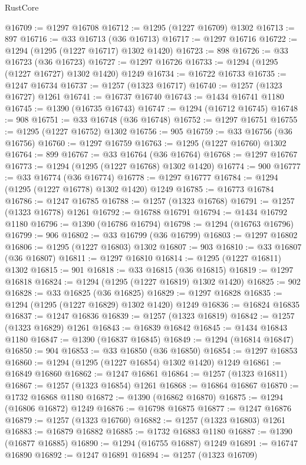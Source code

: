 \begin{lexlean}{RustCore}
\begin{coremodule}
@16709 := @1297 @16708
@16712 := @1295 (@1227 @16709) @1302
@16713 := 897
@16716 := @33 @16713 (@36 @16713)
@16717 := @1297 @16716
@16722 := @1294 (@1295 (@1227 @16717) @1302 @1420)
@16723 := 898
@16726 := @33 @16723 (@36 @16723)
@16727 := @1297 @16726
@16733 := @1294 (@1295 (@1227 @16727) @1302 @1420) @1249
@16734 := @16722 @16733
@16735 := @1247 @16734
@16737 := @1257 (@1323 @16717)
@16740 := @1257 (@1323 @16727) @1261
@16741 := @16737 @16740
@16743 := @1434 @16741 @1180
@16745 := @1390 (@16735 @16743)
@16747 := @1294 (@16712 @16745)
@16748 := 908
@16751 := @33 @16748 (@36 @16748)
@16752 := @1297 @16751
@16755 := @1295 (@1227 @16752) @1302
@16756 := 905
@16759 := @33 @16756 (@36 @16756)
@16760 := @1297 @16759
@16763 := @1295 (@1227 @16760) @1302
@16764 := 899
@16767 := @33 @16764 (@36 @16764)
@16768 := @1297 @16767
@16773 := @1294 (@1295 (@1227 @16768) @1302 @1420)
@16774 := 900
@16777 := @33 @16774 (@36 @16774)
@16778 := @1297 @16777
@16784 := @1294 (@1295 (@1227 @16778) @1302 @1420) @1249
@16785 := @16773 @16784
@16786 := @1247 @16785
@16788 := @1257 (@1323 @16768)
@16791 := @1257 (@1323 @16778) @1261
@16792 := @16788 @16791
@16794 := @1434 @16792 @1180
@16796 := @1390 (@16786 @16794)
@16798 := @1294 (@16763 @16796)
@16799 := 906
@16802 := @33 @16799 (@36 @16799)
@16803 := @1297 @16802
@16806 := @1295 (@1227 @16803) @1302
@16807 := 903
@16810 := @33 @16807 (@36 @16807)
@16811 := @1297 @16810
@16814 := @1295 (@1227 @16811) @1302
@16815 := 901
@16818 := @33 @16815 (@36 @16815)
@16819 := @1297 @16818
@16824 := @1294 (@1295 (@1227 @16819) @1302 @1420)
@16825 := 902
@16828 := @33 @16825 (@36 @16825)
@16829 := @1297 @16828
@16835 := @1294 (@1295 (@1227 @16829) @1302 @1420) @1249
@16836 := @16824 @16835
@16837 := @1247 @16836
@16839 := @1257 (@1323 @16819)
@16842 := @1257 (@1323 @16829) @1261
@16843 := @16839 @16842
@16845 := @1434 @16843 @1180
@16847 := @1390 (@16837 @16845)
@16849 := @1294 (@16814 @16847)
@16850 := 904
@16853 := @33 @16850 (@36 @16850)
@16854 := @1297 @16853
@16860 := @1294 (@1295 (@1227 @16854) @1302 @1420) @1249
@16861 := @16849 @16860
@16862 := @1247 @16861
@16864 := @1257 (@1323 @16811)
@16867 := @1257 (@1323 @16854) @1261
@16868 := @16864 @16867
@16870 := @1732 @16868 @1180
@16872 := @1390 (@16862 @16870)
@16875 := @1294 (@16806 @16872) @1249
@16876 := @16798 @16875
@16877 := @1247 @16876
@16879 := @1257 (@1323 @16760)
@16882 := @1257 (@1323 @16803) @1261
@16883 := @16879 @16882
@16885 := @1732 @16883 @1180
@16887 := @1390 (@16877 @16885)
@16890 := @1294 (@16755 @16887) @1249
@16891 := @16747 @16890
@16892 := @1247 @16891
@16894 := @1257 (@1323 @16709)

\end{coremodule}
\end{lexlean}
